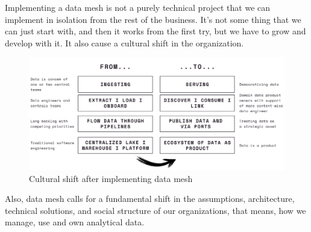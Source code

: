 \documentclass[12pt, a4paper]{book}
\begin{document}
Implementing a data mesh is not a purely technical project that we can implement in isolation from the rest of the business. It's not some thing that we can just start with, and then it works from the first try, but we have to grow and develop with it. It also cause a cultural shift in the organization.

\begin{figure}[h]
	\begin{framed}
		\centering
		\includegraphics[width=16.5cm]{CulturalShift.png}
		\caption{Cultural shift after implementing data mesh}
		\label{culturalshift}
	\end{framed}
\end{figure}

Also, data mesh calls for a fundamental shift in the assumptions, architecture, technical solutions, and social structure of our organizations, that means, how we manage, use and own analytical data. \cite{datamesh2022ch1}
\end{document}
